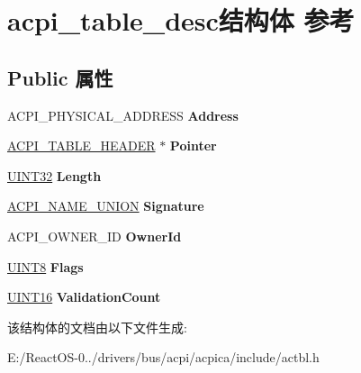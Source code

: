 \hypertarget{structacpi__table__desc}{}\section{acpi\+\_\+table\+\_\+desc结构体 参考}
\label{structacpi__table__desc}
\subsection*{Public 属性}
\begin{DoxyCompactItemize}
\item 
\mbox{\label{structacpi__table__desc_a44f227ae7f96f4dabb469774b6458f7b}} 
A\+C\+P\+I\+\_\+\+P\+H\+Y\+S\+I\+C\+A\+L\+\_\+\+A\+D\+D\+R\+E\+SS {\bfseries Address}
\item 
\mbox{\label{structacpi__table__desc_a9516f9bd7f960b01db61e2a152560256}} 
\hyperlink{structacpi__table__header}{A\+C\+P\+I\+\_\+\+T\+A\+B\+L\+E\+\_\+\+H\+E\+A\+D\+ER} $\ast$ {\bfseries Pointer}
\item 
\mbox{\label{structacpi__table__desc_a86cd729f5baa07224cb0fb5e7582a81c}} 
\hyperlink{_processor_bind_8h_ae1e6edbbc26d6fbc71a90190d0266018}{U\+I\+N\+T32} {\bfseries Length}
\item 
\mbox{\label{structacpi__table__desc_a77144e3af103941c7c1c7aa3363b69ec}} 
\hyperlink{unionacpi__name__union}{A\+C\+P\+I\+\_\+\+N\+A\+M\+E\+\_\+\+U\+N\+I\+ON} {\bfseries Signature}
\item 
\mbox{\label{structacpi__table__desc_a234a2589983f488cc27fb6e13539ab12}} 
A\+C\+P\+I\+\_\+\+O\+W\+N\+E\+R\+\_\+\+ID {\bfseries Owner\+Id}
\item 
\mbox{\label{structacpi__table__desc_a42f59a36e6381fc8cf6d8aa93a9509a1}} 
\hyperlink{_processor_bind_8h_ab27e9918b538ce9d8ca692479b375b6a}{U\+I\+N\+T8} {\bfseries Flags}
\item 
\mbox{\label{structacpi__table__desc_a27e7f1484e5fe7e7ee944ab43a02838b}} 
\hyperlink{_processor_bind_8h_a09f1a1fb2293e33483cc8d44aefb1eb1}{U\+I\+N\+T16} {\bfseries Validation\+Count}
\end{DoxyCompactItemize}


该结构体的文档由以下文件生成\+:\begin{DoxyCompactItemize}
\item 
E\+:/\+React\+O\+S-\/0../drivers/bus/acpi/acpica/include/actbl.\+h\end{DoxyCompactItemize}

